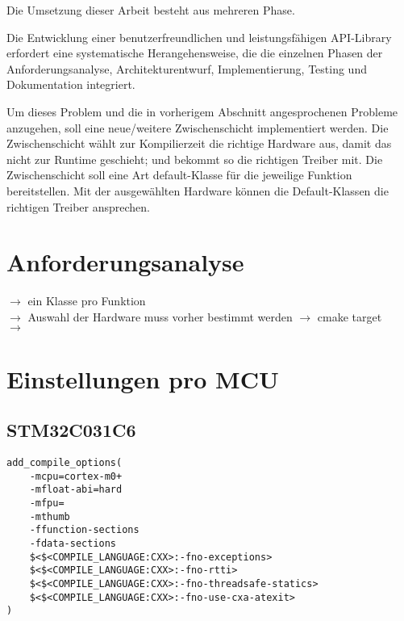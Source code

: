 Die Umsetzung dieser Arbeit besteht aus mehreren Phase.

Die Entwicklung einer benutzerfreundlichen und leistungsfähigen API-Library erfordert eine systematische Herangehensweise, die die einzelnen Phasen der Anforderungsanalyse, Architekturentwurf, Implementierung, Testing und Dokumentation integriert.
 


Um dieses Problem und die in vorherigem Abschnitt angesprochenen Probleme anzugehen, soll eine neue/weitere Zwischenschicht implementiert werden. 
Die Zwischenschicht wählt zur Kompilierzeit die richtige Hardware aus, damit das nicht zur Runtime geschieht; und bekommt so die richtigen Treiber mit.
Die Zwischenschicht soll eine Art default-Klasse für die jeweilige Funktion bereitstellen.
Mit der ausgewählten Hardware können die Default-Klassen die richtigen Treiber ansprechen.

\section{Anforderungsanalyse}
$\rightarrow$ ein Klasse pro Funktion \\
$\rightarrow$ Auswahl der Hardware muss vorher bestimmt werden $\rightarrow$ cmake target \\
$\rightarrow$  



\section{Einstellungen pro MCU}


\subsection{STM32C031C6}
\begin{lstlisting}
add_compile_options(
	-mcpu=cortex-m0+
	-mfloat-abi=hard
	-mfpu=
	-mthumb
	-ffunction-sections
	-fdata-sections
	$<$<COMPILE_LANGUAGE:CXX>:-fno-exceptions>
	$<$<COMPILE_LANGUAGE:CXX>:-fno-rtti>
	$<$<COMPILE_LANGUAGE:CXX>:-fno-threadsafe-statics>
	$<$<COMPILE_LANGUAGE:CXX>:-fno-use-cxa-atexit>		
)
\end{lstlisting}


